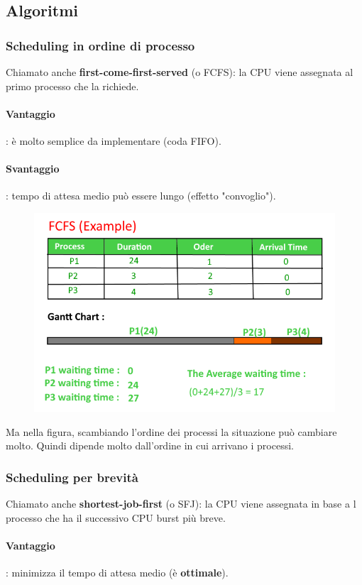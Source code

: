 \documentclass[11pt]{article}
\begin{document}
\subsection{Algoritmi}
\subsubsection{Scheduling in ordine di processo} Chiamato anche \textbf{first-come-first-served} (o FCFS): la CPU viene assegnata al primo processo che la richiede.
\paragraph{Vantaggio}: è molto semplice da implementare (coda FIFO).
\paragraph{Svantaggio}: tempo di attesa medio può essere lungo (effetto "convoglio").
\begin{figure}[H]
\includegraphics[scale=0.7]{FCFS.png}
\centering
\end{figure}
Ma nella figura, scambiando l'ordine dei processi la situazione può cambiare molto. Quindi dipende molto dall'ordine in cui arrivano i processi.

\subsubsection{Scheduling per brevità} Chiamato anche \textbf{shortest-job-first} (o SFJ): la CPU viene assegnata in base a l processo che ha il successivo CPU burst più breve.
\paragraph{Vantaggio}: minimizza il tempo di attesa medio (è \textbf{ottimale}).
\end{document}
